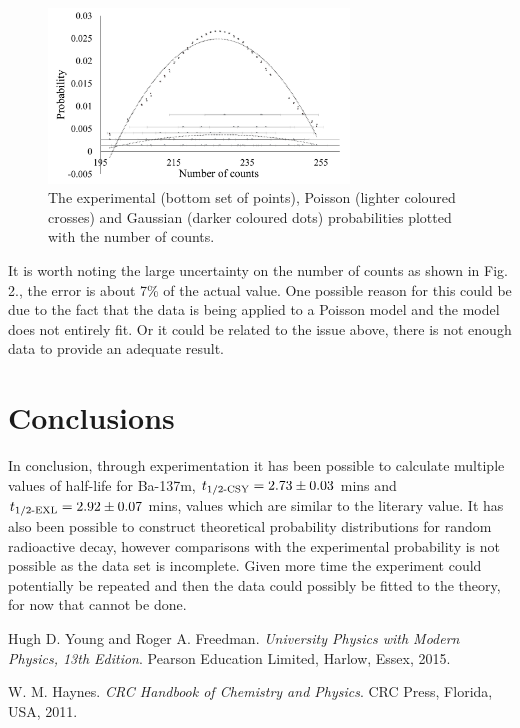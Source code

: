 \documentclass[twocolumn]{revtex4}
\newcommand{\squeezeup}{\vspace{-2.5mm}}
\begin{document}
\begin{figure}[!h]
\begin{center}
\includegraphics[width=8cm]{fig2}
\caption[]{The experimental (bottom set of points), Poisson (lighter coloured crosses) and Gaussian (darker coloured dots) probabilities plotted with the number of counts.}
\label{fig:fig2}
\end{center}
\end{figure}
\squeezeup
\squeezeup
\squeezeup

It is worth noting the large uncertainty on the number of counts as shown in Fig. 2., the error is about 7\% of the actual value. One possible reason for this could be due to the fact that the data is being applied to a Poisson model and the model does not entirely fit. Or it could be related to the issue above, there is not enough data to provide an adequate result.  

\vspace{-2ex}
\section{Conclusions}
\vspace{-2ex}
 
In conclusion, through experimentation it has been possible to calculate multiple values of half-life for Ba-137m, $t\textsubscript{1/2-CSY}=2.73\pm0.03$ mins and $t\textsubscript{1/2-EXL}=2.92\pm0.07$ mins, values which are similar to the literary value. It has also been possible to construct theoretical probability distributions for random radioactive decay, however comparisons with the experimental probability is not possible as the data set is incomplete. Given more time the experiment could potentially be repeated and then the data could possibly be fitted to the theory, for now that cannot be done. 

\begin{thebibliography}{5}
Hugh D. Young and Roger A. Freedman.
\textit{University Physics with Modern Physics, 13th Edition}. 
Pearson Education Limited, Harlow, Essex, 2015.

W. M. Haynes.
\textit{CRC Handbook of Chemistry and Physics}. 
CRC Press, Florida, USA, 2011.
\end{thebibliography}
\end{document}
